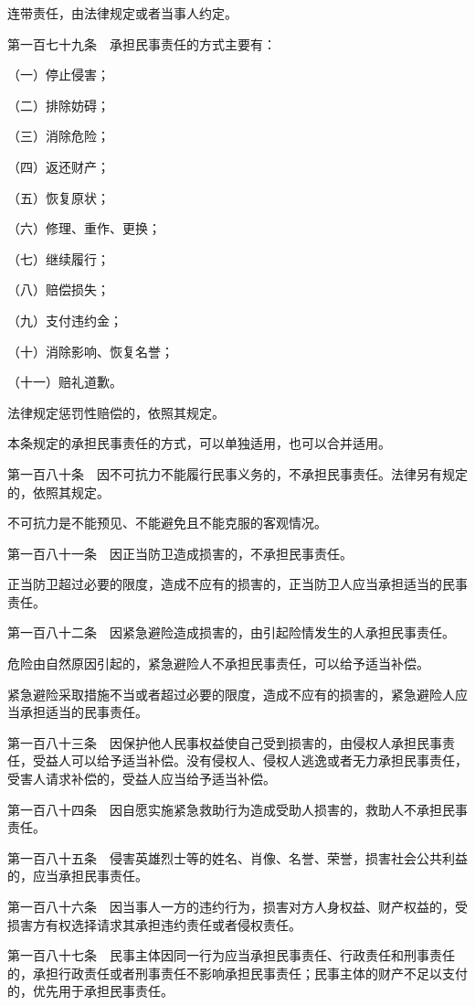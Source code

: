 \documentclass[UTF8,12pt,a4paper]{ctexbook}
\begin{document}
连带责任，由法律规定或者当事人约定。

第一百七十九条　承担民事责任的方式主要有：

（一）停止侵害；

（二）排除妨碍；

（三）消除危险；

（四）返还财产；

（五）恢复原状；

（六）修理、重作、更换；

（七）继续履行；

（八）赔偿损失；

（九）支付违约金；

（十）消除影响、恢复名誉；

（十一）赔礼道歉。

法律规定惩罚性赔偿的，依照其规定。

本条规定的承担民事责任的方式，可以单独适用，也可以合并适用。

第一百八十条　因不可抗力不能履行民事义务的，不承担民事责任。法律另有规定的，依照其规定。

不可抗力是不能预见、不能避免且不能克服的客观情况。

第一百八十一条　因正当防卫造成损害的，不承担民事责任。

正当防卫超过必要的限度，造成不应有的损害的，正当防卫人应当承担适当的民事责任。

第一百八十二条　因紧急避险造成损害的，由引起险情发生的人承担民事责任。

危险由自然原因引起的，紧急避险人不承担民事责任，可以给予适当补偿。

紧急避险采取措施不当或者超过必要的限度，造成不应有的损害的，紧急避险人应当承担适当的民事责任。

第一百八十三条　因保护他人民事权益使自己受到损害的，由侵权人承担民事责任，受益人可以给予适当补偿。没有侵权人、侵权人逃逸或者无力承担民事责任，受害人请求补偿的，受益人应当给予适当补偿。

第一百八十四条　因自愿实施紧急救助行为造成受助人损害的，救助人不承担民事责任。

第一百八十五条　侵害英雄烈士等的姓名、肖像、名誉、荣誉，损害社会公共利益的，应当承担民事责任。

第一百八十六条　因当事人一方的违约行为，损害对方人身权益、财产权益的，受损害方有权选择请求其承担违约责任或者侵权责任。

第一百八十七条　民事主体因同一行为应当承担民事责任、行政责任和刑事责任的，承担行政责任或者刑事责任不影响承担民事责任；民事主体的财产不足以支付的，优先用于承担民事责任。
\end{document}
